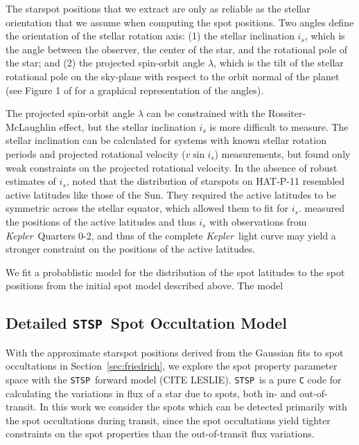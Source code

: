 \documentclass[iop]{emulateapj}
\newcommand{\stsp}{\texttt{STSP}}
\newcommand{\kepler}{\textit{Kepler}}
\begin{document}

The starspot positions that we extract are only as reliable as the stellar orientation that we assume when computing the spot positions. Two angles define the orientation of the stellar rotation axis: (1) the stellar inclination $i_s$, which is the angle between the observer, the center of the star, and the rotational pole of the star; and (2) the projected spin-orbit angle $\lambda$, which is the tilt of the stellar rotational pole on the sky-plane with respect to the orbit normal of the planet (see Figure 1 of \citealt{Fabrycky2009} for a graphical representation of the angles). 


The projected spin-orbit angle $\lambda$ can be constrained with the Rossiter-McLaughlin effect, but the stellar inclination $i_s$ is more difficult to measure. The stellar inclination can be calculated for systems with known stellar rotation periods and projected rotational velocity ($v \sin i_s$) measurements, but \citet{bakos2010} found only weak constraints on the projected rotational velocity. In the absence of robust estimates of $i_s$, \citet{Sanchis-Ojeda2011} noted that the distribution of starspots on HAT-P-11 resembled active latitudes like those of the Sun. They required the active latitudes to be symmetric across the stellar equator, which allowed them to fit for $i_s$. \citet{Sanchis-Ojeda2011} measured the positions of the active latitudes and thus $i_s$ with observations from \kepler\ Quarters 0-2, and thus of the complete \kepler\ light curve may yield a stronger constraint on the positions of the active latitudes.


We fit a probablistic model for the distribution of the spot latitudes to the spot positions from the initial spot model described above. The model 




\subsection{Detailed \stsp\ Spot Occultation Model} \label{sec:stsp}


With the approximate starspot positions derived from the Gaussian fits to spot occultations in Section~\ref{sec:friedrich}, we explore the spot property parameter space with the \stsp\ forward model (CITE LESLIE). \stsp\ is a pure \texttt{C} code for calculating the variations in flux of a star due to spots, both in- and out-of-transit. In this work we consider the spots which can be detected primarily with the spot occultations during transit, since the spot occultations yield tighter constraints on the spot properties than the out-of-transit flux variations.
\end{document}
